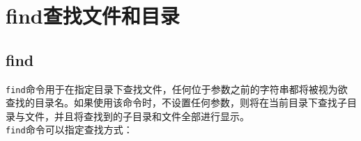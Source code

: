 \documentclass[12pt, openany, oneside]{book}
\begin{document}
\newpage

\section{find查找文件和目录}

\subsection{find}

\lstinline|find|命令用于在指定目录下查找文件，任何位于参数之前的字符串都将被视为欲查找的目录名。如果使用该命令时，不设置任何参数，则将在当前目录下查找子目录与文件，并且将查找到的子目录和文件全部进行显示。 \\

\lstinline|find|命令可以指定查找方式：
\end{document}
